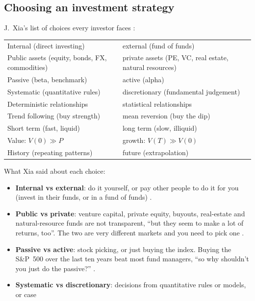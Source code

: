 \begin{paracol}{2}
\section{Choosing an investment strategy}\label{sec:strategies}
J.~Xia's list of choices every investor faces :
\begin{center}\small
\begin{tabularx}{\linewidth}{@{}L@{\quad vs\quad}L@{}}
\toprule
Internal (direct investing) & external (fund of funds)\\
Public assets (equity, bonds, FX, commodities) & private assets (PE, VC, real estate, natural resources)\\
Passive (beta, benchmark) & active (alpha)\\
Systematic (quantitative rules) & discretionary (fundamental judgement)\\
Deterministic relationships & statistical relationships\\
Trend following (buy strength) & mean reversion (buy the dip)\\
Short term (fast, liquid) & long term (slow, illiquid)\\
Value: $V(0) \gg P$ & growth: $V(T) \gg V(0)$\\
History (repeating patterns) & future (extrapolation)\\
\bottomrule
\end{tabularx}
\end{center} 
What Xia said about each choice:
\begin{itemize}
  \item \textbf{Internal vs external}: do it yourself, or pay other people to do it for you
        (invest in their funds, or in a fund of funds) .
  \item \textbf{Public vs private}: venture capital, private equity, buyouts, real-estate and
        natural-resource funds are not transparent, ``but they seem to make a lot of returns,
        too''. The two are very different markets and you need to pick one .
  \item \textbf{Passive vs active}: stock picking, or just buying the index. Buying the
        S\&P~500 over the last ten years beat most fund managers, ``so why shouldn't you just do the
        passive?'' .
  \item \textbf{Systematic vs discretionary}: decisions from quantitative rules or models, or case

\end{itemize}
\end{paracol}
